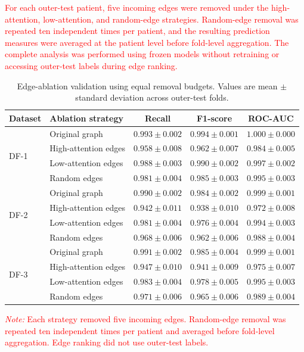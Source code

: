 \documentclass[pdflatex,sn-mathphys-num]{sn-jnl}%
\theoremstyle{thmstyleone}%
\theoremstyle{thmstyletwo}%
\theoremstyle{thmstylethree}%
\begin{document}
\textcolor{red}{
For each outer-test patient, five incoming edges were removed under the
high-attention, low-attention, and random-edge strategies. Random-edge removal
was repeated ten independent times per patient, and the resulting prediction
measures were averaged at the patient level before fold-level aggregation.
The complete analysis was performed using frozen models without retraining or
accessing outer-test labels during edge ranking.
}

\begin{table}[!ht]
\centering
\caption{
Edge-ablation validation using equal removal budgets. Values are mean
\(\pm\) standard deviation across outer-test folds.
}
\label{tab:edge_ablation_results}
\scriptsize
\setlength{\tabcolsep}{3.8pt}
\renewcommand{\arraystretch}{1.06}
\begin{tabular}{@{}llccc@{}}
\toprule
\textbf{Dataset} &
\textbf{Ablation strategy} &
\textbf{Recall} &
\textbf{F1-score} &
\textbf{ROC-AUC} \\
\midrule
\multirow{4}{*}{DF-1}
& Original graph
& \textbf{$0.993\pm0.002$}
& \textbf{$0.994\pm0.001$}
& \textbf{$1.000\pm0.000$} \\
& High-attention edges
& $0.958\pm0.008$
& $0.962\pm0.007$
& $0.984\pm0.005$ \\
& Low-attention edges
& $0.988\pm0.003$
& $0.990\pm0.002$
& $0.997\pm0.002$ \\
& Random edges
& $0.981\pm0.004$
& $0.985\pm0.003$
& $0.995\pm0.003$ \\
\midrule
\multirow{4}{*}{DF-2}
& Original graph
& \textbf{$0.990\pm0.002$}
& \textbf{$0.984\pm0.002$}
& \textbf{$0.999\pm0.001$} \\
& High-attention edges
& $0.942\pm0.011$
& $0.938\pm0.010$
& $0.972\pm0.008$ \\
& Low-attention edges
& $0.981\pm0.004$
& $0.976\pm0.004$
& $0.994\pm0.003$ \\
& Random edges
& $0.968\pm0.006$
& $0.962\pm0.006$
& $0.988\pm0.004$ \\
\midrule
\multirow{4}{*}{DF-3}
& Original graph
& \textbf{$0.991\pm0.002$}
& \textbf{$0.985\pm0.004$}
& \textbf{$0.999\pm0.001$} \\
& High-attention edges
& $0.947\pm0.010$
& $0.941\pm0.009$
& $0.975\pm0.007$ \\
& Low-attention edges
& $0.983\pm0.004$
& $0.978\pm0.005$
& $0.995\pm0.003$ \\
& Random edges
& $0.971\pm0.006$
& $0.965\pm0.006$
& $0.989\pm0.004$ \\
\bottomrule
\end{tabular}
\vspace{2pt}
\begin{minipage}{0.97\textwidth}
\footnotesize
\textcolor{red}{
\textit{Note:} Each strategy removed five incoming edges. Random-edge removal
was repeated ten independent times per patient and averaged before fold-level
aggregation. Edge ranking did not use outer-test labels.
}
\end{minipage}
\end{table}
\end{document}

